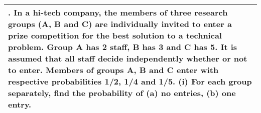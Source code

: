 \documentclass[a4paper,12pt]{article}
\begin{document}

\begin{table}[ht!]
     
\centering
     
\begin{tabular}{|p{15cm}|}
     
\hline        

\noindent
2. In a hi-tech company, the members of three research groups (A, B and C) are individually invited to enter a prize competition for the best solution to a technical problem. Group A has 2 staff, B has 3 and C has 5. It is assumed that all staff decide independently whether or not to enter. Members of groups A, B and C enter with respective probabilities 1/2, 1/4 and 1/5.
(i) For each group separately, find the probability of (a) no entries, (b) one entry.
\\ \hline
      
\end{tabular}
    
\end{table}



\end{document}
